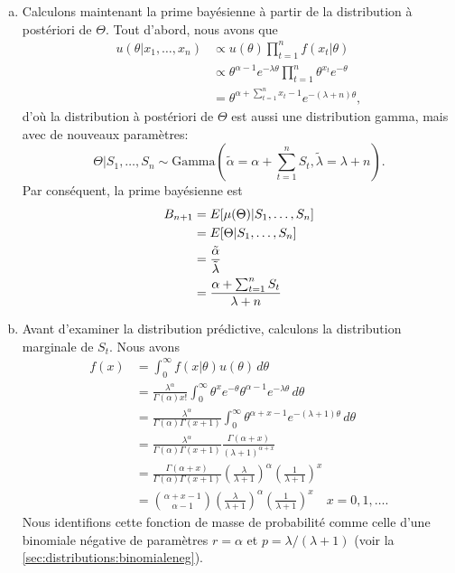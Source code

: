 \begin{exemple}
\begin{enumerate}[a)]
  \item Calculons maintenant la prime bayésienne à partir de la
    distribution à postériori de $\Theta$. Tout d'abord, nous avons
    que
    \begin{align*}
      u(\theta|x_1, \dots, x_n)
      &\propto u(\theta) \prod_{t = 1}^n f(x_t|\theta) \\
      &\propto \theta^{\alpha - 1} e^{-\lambda \theta}
      \prod_{t = 1}^n \theta^{x_t} e^{-\theta} \\
      &= \theta^{\alpha + \sum_{t = 1}^n x_t - 1}
      e^{-(\lambda + n) \theta},
    \end{align*}
    d'où la distribution à postériori de $\Theta$ est aussi une
    distribution gamma, mais avec de nouveaux paramètres:
    \begin{equation*}
      \Theta|S_1, \dots, S_n \sim \text{Gamma}(\tilde{\alpha} = \alpha
      + \sum_{t = 1}^n S_t, \tilde{\lambda} = \lambda + n).
    \end{equation*}
    Par conséquent, la prime bayésienne est
    \begin{align*}
      B_{n + 1}
      &= E [ \mu(\Theta)|S_1, \dots, S_n ] \\
      &= E [ \Theta|S_1, \dots, S_n ] \\
      &= \frac{\tilde{\alpha}}{\tilde{\lambda}} \\
      &= \frac{\alpha + \sum_{t = 1}^n S_t}{\lambda + n}
    \end{align*}

  \item Avant d'examiner la distribution prédictive, calculons la
    distribution marginale de $S_t$. Nous avons
    \begin{align*}
      f(x)
      &= \int_0^\infty f(x|\theta) u(\theta)\, d\theta \\
      &= \frac{\lambda^\alpha}{\Gamma(\alpha) x!}
      \int_0^\infty \theta^x e^{-\theta}
      \theta^{\alpha - 1} e^{-\lambda \theta}\, d\theta \\
      &= \frac{\lambda^\alpha}{\Gamma(\alpha) \Gamma(x + 1)}
      \int_0^\infty \theta^{\alpha + x - 1}
      e^{-(\lambda + 1) \theta}\, d\theta \\
      &= \frac{\lambda^\alpha}{\Gamma(\alpha) \Gamma(x + 1)}
      \frac{\Gamma(\alpha + x)}{(\lambda + 1)^{\alpha + x}} \\
      &= \frac{\Gamma(\alpha + x)}{\Gamma(\alpha) \Gamma(x + 1)}
      \left(
        \frac{\lambda}{\lambda + 1}
      \right)^\alpha
      \left(
        \frac{1}{\lambda + 1}
      \right)^x \\
      &= \binom{\alpha + x - 1}{\alpha - 1}
        \left(
          \frac{\lambda}{\lambda + 1}
        \right)^\alpha
        \left(
          \frac{1}{\lambda + 1}
        \right)^x
        \quad x = 0, 1, \dots.
    \end{align*}
    Nous identifions cette fonction de masse de probabilité comme
    celle d'une binomiale négative de paramètres $r = \alpha$ et
    $p = \lambda/(\lambda + 1)$ (voir la
    \autoref{sec:distributions:binomialeneg}).


\end{enumerate}
\end{exemple}
